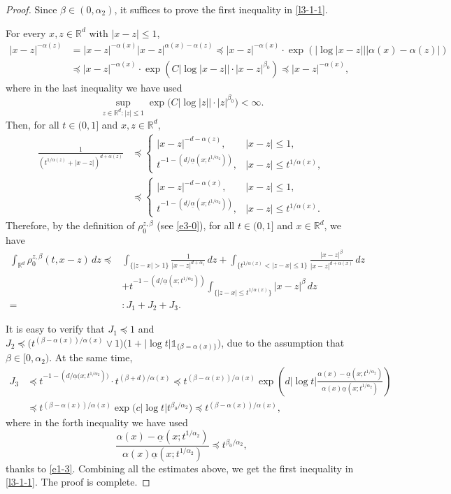 \documentclass[a4paper,11pt]{amsart}
\renewcommand{\le}{\leqslant}
\newcommand{\R}{\mathds R}
\newcommand{\B}{\beta}
\newcommand{\I}{\mathds 1}
\newcommand{\p}{\preceq}
\newcommand{\A}{\alpha}
\theoremstyle{definition}
\begin{document}
\begin{proof} Since $\beta\in (0,\A_2)$, it suffices to prove the first inequality in \eqref{l3-1-1}.

For every $x,z\in \R^d$ with $|x-z|\le 1$,
\begin{equation}\label{l3-1-1a}
\begin{split}
|x-z|^{-\A(z)}&=|x-z|^{-\A(x)}|x-z|^{\A(x)-\A(z)}\p |x-z|^{-\A(x)}\cdot \exp\left(\left|\log|x-z|\right|\left|\A(x)-\A(z)\right|\right)\\
&\p |x-z|^{-\A(x)}\cdot \exp\left(C\left|\log|x-z|\right|\cdot |x-z|^{\B_0}\right)
\p |x-z|^{-\A(x)},
\end{split}
\end{equation}
where in the last inequality we have used
$$\sup_{z\in \R^d: |z|\le 1}\exp\big(C|\log
|z||\cdot|z|^{\beta_0}\big)<\infty.$$
Then, for all $t\in (0,1]$ and $x,z\in \R^d$,
\begin{align*}
\frac{1}{(t^{{1}/{\A(z)}}+|x-z|)^{d+\A(z)}}& \p
\begin{cases}
|x-z|^{-d-\A(z)},& |x-z|\le 1,\\
t^{-1-({d/\underline{\A}(x; t^{1/\A_2})})},&  |x-z|\le t^{{1/\A(x)}},
\end{cases}
\\
&\p
\begin{cases}
|x-z|^{-d-\A(x)},& |x-z|\le 1,\\
t^{-1-({d/\underline{\A}(x; t^{1/\A_2})})},&  |x-z|\le t^{{1/\A(x)}}.
\end{cases}
\end{align*}
Therefore, by the definition of $\rho_{0}^{z,\beta}$ (see \eqref{e3-0}), for all $t\in (0,1]$ and $x\in \R^d$, we have
\begin{align*}
\int_{\R^d}\rho_{0}^{z,\beta}(t,x-z)\,dz \p&
\int_{\{|z-x|> 1\}}\frac{1}{|x-z|^{d+\A_1}}\,dz +
\int_{\{t^{{1/\A(x)}}<|z-x|\le 1\}}\frac{|x-z|^{\beta}}{|x-z|^{d+\A(x)}}\,dz\\
&+t^{-1-({d/\underline{\A}(x; t^{1/\A_2})})}\int_{\{|z-x|\le t^{1/\A(x)}\}}
|x-z|^{\beta}\,dz\\
=&:J_1+J_2+J_3.
\end{align*}


It is easy to verify that $J_1\p 1$  and $J_2\p \big(t^{(\beta-\A(x))/{\A(x)}}\vee 1\big)
\big(1+|\log t|\I_{\{\B=\A(x)\}}\big)$, due to the assumption that $\beta\in [0,\A_2)$.
At the same time,
\begin{align*}
J_3&\p t^{-1-({d/\underline{\A}(x; t^{1/\A_2}}))}\cdot t^{(\beta+d)/\A(x)} \p t^{(\beta-\A(x))/\A(x)}\exp\left(d|\log t| \frac{\A(x)-\underline{\A}(x;t^{{1/\A_2}}) }{\A(x)\underline{\A}(x;t^{{1/\A_2}})}\right) \\
&\p t^{(\beta-\A(x))/\A(x)}\exp\big(c|\log t| t^{{\B_0}/{\A_2}}\big)\p t^{{(\beta-\A(x))}/{\A(x)}},
\end{align*}
where in the forth inequality we have used
$$
\frac{\A(x)-\underline{\A}(x;t^{{1/\A_2}}) }{\A(x)\underline{\A}(x;t^{{1/\A_2}})}\p t^{{\B_0}/{\A_2}},
$$
 thanks to \eqref{e1-3}.
Combining all the estimates above, we get the first inequality in \eqref{l3-1-1}. The proof is complete.
\end{proof}
\end{document}
